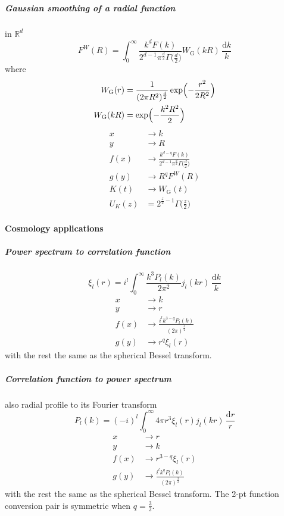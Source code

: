 \documentclass{article}
\renewcommand{\d}{\mathrm{d}}
\newcommand{\Gauss}{\textrm{G}}
\begin{document}
\subparagraph{Gaussian smoothing of a radial function}
in $\mathbb{R}^d$
\begin{equation}
    F^W(R) = \int_0^\infty \frac{k^dF(k)}{2^{d-1}\pi^\frac{d}2\Gamma\bigl(\frac{d}2\bigr)}
                    W_\Gauss(kR) \,\frac{\d k}k
\end{equation}
where
\begin{align}
    W_\Gauss(r) &= \frac1{(2\pi R^2)^\frac{d}2} \exp\Bigl(-\frac{r^2}{2R^2}\Bigr)  \\
    W_\Gauss(kR) &= \exp\Bigl(-\frac{k^2R^2}2\Bigr)
\end{align}
\begin{align}
    x &\to k  \\
    y &\to R  \\
    f(x) &\to \frac{k^{d-q}F(k)}{2^{d-1}\pi^\frac{d}2\Gamma\bigl(\frac{d}2\bigr)}  \\
    g(y) &\to R^q F^W(R)  \\
    K(t) &\to W_\Gauss(t)  \\
    U_K(z) &= 2^{\frac{z}2-1} \Gamma\bigl(\tfrac{z}2\bigr)
\end{align}


\paragraph{Cosmology applications}


\subparagraph{Power spectrum to correlation function}
\begin{equation}
    \xi_l(r) = i^l \int_0^\infty \frac{k^3P_l(k)}{2\pi^2} j_l(kr) \,\frac{\d k}k
\end{equation}
\begin{align}
    x &\to k  \\
    y &\to r  \\
    f(x) &\to \frac{i^l k^{3-q} P_l(k)}{(2\pi)^\frac32}  \\
    g(y) &\to r^q \xi_l(r)
\end{align}
with the rest the same as the spherical Bessel transform.


\subparagraph{Correlation function to power spectrum}
also radial profile to its Fourier transform
\begin{equation}
    P_l(k) = (-i)^l \int_0^\infty 4\pi r^3\xi_l(r) j_l(kr) \,\frac{\d r}r
\end{equation}
\begin{align}
    x &\to r  \\
    y &\to k  \\
    f(x) &\to r^{3-q} \xi_l(r)  \\
    g(y) &\to \frac{i^l k^q P_l(k)}{(2\pi)^\frac32}
\end{align}
with the rest the same as the spherical Bessel transform.
The 2-pt function conversion pair is symmetric when $q=\frac32$.
\end{document}
